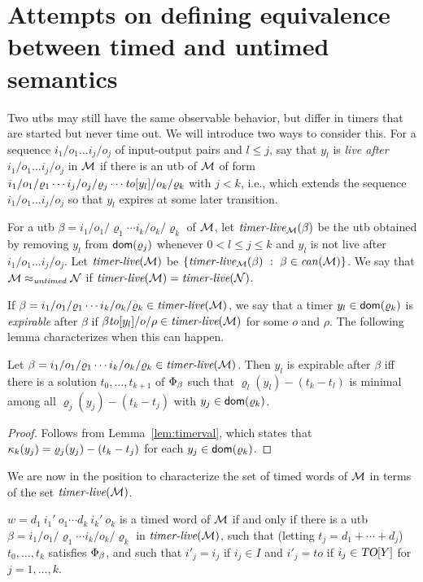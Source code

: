 \section{Attempts on defining equivalence between timed and untimed semantics}

Two utbs may still have the same observable behavior, but
differ in timers that are started but never time out. We will introduce two
ways to consider this.
For a sequence $i_1/o_1 \ldots i_j/o_j$ of input-output pairs and
$l \leq j$, say that $y_l$ is \emph{live after $i_1/o_1 \ldots i_j/o_j$} in ${\mathcal M}$
if there is an utb of ${\mathcal M}$ of form
${i_1/o_1/\varrho_1}  \cdots {i_j/o_j/\varrho_j} \cdots {\mathit{to}[y_l]/o_k/\varrho_k}$
with $j < k$,  i.e., which extends the sequence
$i_1/o_1 \ldots i_j/o_j$ so that $y_l$ expires at some later transition.

For a utb $\beta  =  {i_1/o_1/\varrho_1}  \cdots {i_k/o_k/\varrho_k}$ of ${\mathcal M}$,
let $\mbox{\it timer-live}_{{\mathcal M}}({\beta})$ be the utb obtained by removing 
$y_l$ from ${\textsf{dom}}(\varrho_j)$ whenever $0 < l \leq j \leq k$ and
$y_l$ is not live after $i_1/o_1 \ldots i_j/o_j$.
Let
$\mbox{\it timer-live}({{\mathcal M}})$ be $\lbrace \mbox{\it timer-live}_{{\mathcal M}}({\beta}) ~:~ \beta \in \mathit{can}({{\mathcal M}})\rbrace$.
We say that ${\mathcal M} \approx_{\mathit{untimed}} {\mathcal N}$ if
$\mbox{\it timer-live}({{\mathcal M}}) = \mbox{\it timer-live}({{\mathcal N}})$.


If $\beta  =  {i_1/o_1/\varrho_1}  \cdots {i_k/o_k/\varrho_k} \in \mbox{\it timer-live}({{\mathcal M}})$,
we say that a timer $y_l \in {\textsf{dom}}(\varrho_k)$
is {\em expirable} after $\beta$ if $\beta \mathit{to}[y_l]/o/\rho \in \mbox{\it timer-live}({{\mathcal M}})$ for some $o$ and $\rho$.
The following lemma characterizes when this can happen.

\begin{lemma}
\label{expirable}
Let $\beta  =  {i_1/o_1/\varrho_1}  \cdots {i_k/o_k/\varrho_k} \in \mbox{\it timer-live}({{\mathcal M}})$.
Then $y_l$ is expirable after $\beta$ iff 
there is a solution $t_0, \ldots , t_{k+1}$ of  $\Phi_{\beta}$ such that
$\varrho_l(y_l) - (t_k - t_l)$ is minimal among all
$\varrho_j(y_j) - (t_k - t_j)$ with $y_j \in {\textsf{dom}}(\varrho_k)$.
\end{lemma}
\begin{proof}
Follows from Lemma~\ref{lem:timerval}, which states that
$\kappa_k(y_j) = \varrho_j(y_j) - (t_k - t_j)$ for each $y_j \in {\textsf{dom}}(\varrho_k)$.
\end{proof}

We are now in the position to characterize the set of
timed words of ${\mathcal M}$ in terms of the set $\mbox{\it timer-live}({{\mathcal M}})$.

\begin{theorem}
\label{thm:correspondence}
$w =  d_1 ~ i_1' ~ o_1 \cdots d_k ~ i_k' ~ o_k$
  is a timed word of ${\mathcal M}$ if and only if there is a utb 
  $\beta = {i_1/o_1/\varrho_1}  \cdots {i_k/o_k/\varrho_k}$
   in $\mbox{\it timer-live}({{\mathcal M}})$,
   such that (letting $t_j = d_1 + \cdots + d_j$)
   $t_0, \ldots, t_k$ satisfies $\Phi_{\beta}$, and
  such that 
$i'_j   =   i_j$ if $i_j \in I$ and
  $i'_j   = \mathit{to}$ if $i_j \in \mbox{\sl TO}[Y]$
  for $j = 1 , \ldots , k$.
\end{theorem}
  
